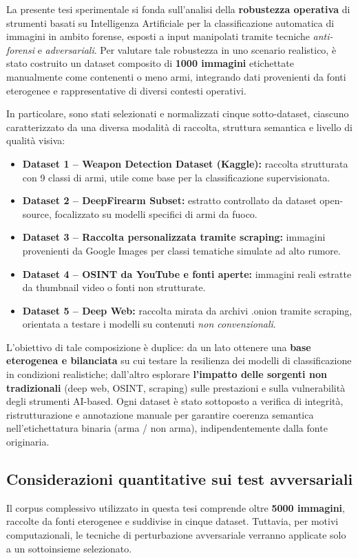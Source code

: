 La presente tesi sperimentale si fonda sull’analisi della \textbf{robustezza operativa} di strumenti basati su Intelligenza Artificiale per la classificazione automatica di immagini in ambito forense, esposti a input manipolati tramite tecniche \textit{anti-forensi} e \textit{adversariali}. Per valutare tale robustezza in uno scenario realistico, è stato costruito un dataset composito di \textbf{1000 immagini} etichettate manualmente come contenenti o meno armi, integrando dati provenienti da fonti eterogenee e rappresentative di diversi contesti operativi.

In particolare, sono stati selezionati e normalizzati cinque sotto-dataset, ciascuno caratterizzato da una diversa modalità di raccolta, struttura semantica e livello di qualità visiva:

\begin{itemize}
\item \textbf{Dataset 1 – Weapon Detection Dataset (Kaggle):} raccolta strutturata con 9 classi di armi, utile come base per la classificazione supervisionata.
\item \textbf{Dataset 2 – DeepFirearm Subset:} estratto controllato da dataset open-source, focalizzato su modelli specifici di armi da fuoco.
\item \textbf{Dataset 3 – Raccolta personalizzata tramite scraping:} immagini provenienti da Google Images per classi tematiche simulate ad alto rumore.
\item \textbf{Dataset 4 – OSINT da YouTube e fonti aperte:} immagini reali estratte da thumbnail video o fonti non strutturate.
\item \textbf{Dataset 5 – Deep Web:} raccolta mirata da archivi .onion tramite scraping, orientata a testare i modelli su contenuti \textit{non convenzionali}.
\end{itemize}

L’obiettivo di tale composizione è duplice: da un lato ottenere una \textbf{base eterogenea e bilanciata} su cui testare la resilienza dei modelli di classificazione in condizioni realistiche; dall’altro esplorare \textbf{l’impatto delle sorgenti non tradizionali} (deep web, OSINT, scraping) sulle prestazioni e sulla vulnerabilità degli strumenti AI-based. Ogni dataset è stato sottoposto a verifica di integrità, ristrutturazione e annotazione manuale per garantire coerenza semantica nell’etichettatura binaria (arma / non arma), indipendentemente dalla fonte originaria.


\subsection*{Considerazioni quantitative sui test avversariali}
Il corpus complessivo utilizzato in questa tesi comprende oltre \textbf{5000 immagini}, raccolte da fonti eterogenee e suddivise in cinque dataset. Tuttavia, per motivi computazionali, le tecniche di perturbazione avversariale verranno applicate solo a un sottoinsieme selezionato.

